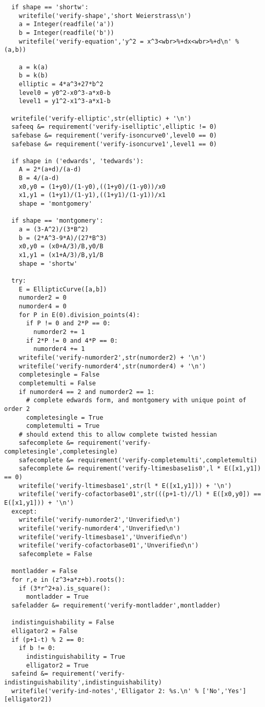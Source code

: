 \begin{lstlisting}
  if shape == 'shortw':
    writefile('verify-shape','short Weierstrass\n')
    a = Integer(readfile('a'))
    b = Integer(readfile('b'))
    writefile('verify-equation','y^2 = x^3<wbr>%+dx<wbr>%+d\n' % (a,b))

    a = k(a)
    b = k(b)
    elliptic = 4*a^3+27*b^2
    level0 = y0^2-x0^3-a*x0-b
    level1 = y1^2-x1^3-a*x1-b

  writefile('verify-elliptic',str(elliptic) + '\n')
  safeeq &= requirement('verify-iselliptic',elliptic != 0)
  safebase &= requirement('verify-isoncurve0',level0 == 0)
  safebase &= requirement('verify-isoncurve1',level1 == 0)

  if shape in ('edwards', 'tedwards'):
    A = 2*(a+d)/(a-d)
    B = 4/(a-d)
    x0,y0 = (1+y0)/(1-y0),((1+y0)/(1-y0))/x0
    x1,y1 = (1+y1)/(1-y1),((1+y1)/(1-y1))/x1
    shape = 'montgomery'

  if shape == 'montgomery':
    a = (3-A^2)/(3*B^2)
    b = (2*A^3-9*A)/(27*B^3)
    x0,y0 = (x0+A/3)/B,y0/B
    x1,y1 = (x1+A/3)/B,y1/B
    shape = 'shortw'

  try:
    E = EllipticCurve([a,b])
    numorder2 = 0
    numorder4 = 0
    for P in E(0).division_points(4):
      if P != 0 and 2*P == 0:
        numorder2 += 1
      if 2*P != 0 and 4*P == 0:
        numorder4 += 1
    writefile('verify-numorder2',str(numorder2) + '\n')
    writefile('verify-numorder4',str(numorder4) + '\n')
    completesingle = False
    completemulti = False
    if numorder4 == 2 and numorder2 == 1:
      # complete edwards form, and montgomery with unique point of order 2
      completesingle = True
      completemulti = True
    # should extend this to allow complete twisted hessian
    safecomplete &= requirement('verify-completesingle',completesingle)
    safecomplete &= requirement('verify-completemulti',completemulti)
    safecomplete &= requirement('verify-ltimesbase1is0',l * E([x1,y1]) == 0)
    writefile('verify-ltimesbase1',str(l * E([x1,y1])) + '\n')
    writefile('verify-cofactorbase01',str(((p+1-t)//l) * E([x0,y0]) == E([x1,y1])) + '\n')
  except:
    writefile('verify-numorder2','Unverified\n')
    writefile('verify-numorder4','Unverified\n')
    writefile('verify-ltimesbase1','Unverified\n')
    writefile('verify-cofactorbase01','Unverified\n')
    safecomplete = False

  montladder = False
  for r,e in (z^3+a*z+b).roots():
    if (3*r^2+a).is_square():
      montladder = True
  safeladder &= requirement('verify-montladder',montladder)

  indistinguishability = False
  elligator2 = False
  if (p+1-t) % 2 == 0:
    if b != 0:
      indistinguishability = True
      elligator2 = True
  safeind &= requirement('verify-indistinguishability',indistinguishability)
  writefile('verify-ind-notes','Elligator 2: %s.\n' % ['No','Yes'][elligator2])


\end{lstlisting}

